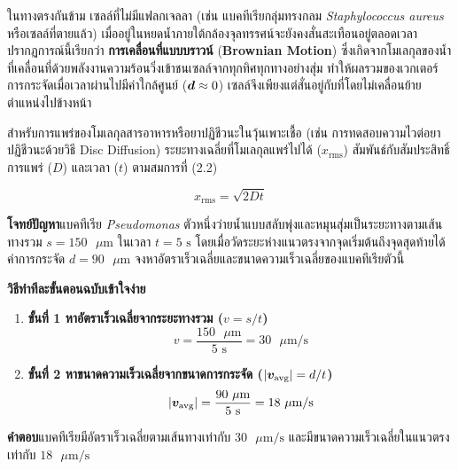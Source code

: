\vspace{4pt}


ในทางตรงกันข้าม เซลล์ที่ไม่มีแฟลกเจลลา (เช่น แบคทีเรียกลุ่มทรงกลม \textit{Staphylococcus aureus} หรือเซลล์ที่ตายแล้ว) เมื่ออยู่ในหยดน้ำภายใต้กล้องจุลทรรศน์จะยังคงสั่นสะเทือนอยู่ตลอดเวลา ปรากฏการณ์นี้เรียกว่า \textbf{การเคลื่อนที่แบบบราวน์} (\textbf{Brownian Motion}) ซึ่งเกิดจากโมเลกุลของน้ำที่เคลื่อนที่ด้วยพลังงานความร้อนวิ่งเข้าชนเซลล์จากทุกทิศทุกทางอย่างสุ่ม ทำให้ผลรวมของเวกเตอร์การกระจัดเมื่อเวลาผ่านไปมีค่าใกล้ศูนย์ ($\bm{d} \approx 0$) เซลล์จึงเพียงแต่สั่นอยู่กับที่โดยไม่เคลื่อนย้ายตำแหน่งไปข้างหน้า

สำหรับการแพร่ของโมเลกุลสารอาหารหรือยาปฏิชีวนะในวุ้นเพาะเชื้อ (เช่น การทดสอบความไวต่อยาปฏิชีวนะด้วยวิธี Disc Diffusion) ระยะทางเฉลี่ยที่โมเลกุลแพร่ไปได้ ($x_{\text{rms}}$) สัมพันธ์กับสัมประสิทธิ์การแพร่ ($D$) และเวลา ($t$) ตามสมการที่ (2.2)

\begin{equation}
    x_{\text{rms}} = \sqrt{2 D t}
\end{equation}

\begin{worked}
\textbf{โจทย์ปัญหา}\quad แบคทีเรีย \textit{Pseudomonas} ตัวหนึ่งว่ายน้ำแบบสลับพุ่งและหมุนสุ่มเป็นระยะทางตามเส้นทางรวม $s = 150\text{ }\mu\text{m}$ ในเวลา $t = 5\text{ s}$ โดยเมื่อวัดระยะห่างแนวตรงจากจุดเริ่มต้นถึงจุดสุดท้ายได้ค่าการกระจัด $d = 90\text{ }\mu\text{m}$ จงหาอัตราเร็วเฉลี่ยและขนาดความเร็วเฉลี่ยของแบคทีเรียตัวนี้

\textbf{วิธีทำทีละขั้นตอนฉบับเข้าใจง่าย}
\begin{enumerate}
    \item \textbf{ขั้นที่ 1 หาอัตราเร็วเฉลี่ยจากระยะทางรวม ($v = s / t$)}
    \[
        v = \frac{150\text{ }\mu\text{m}}{5\text{ s}} = 30\text{ }\mu\text{m/s}
    \]
    \item \textbf{ขั้นที่ 2 หาขนาดความเร็วเฉลี่ยจากขนาดการกระจัด ($|\bm{v}_{\text{avg}}| = d / t$)}
    \[
        |\bm{v}_{\text{avg}}| = \frac{90\text{ }\mu\text{m}}{5\text{ s}} = 18\text{ }\mu\text{m/s}
    \]
\end{enumerate}
\textbf{คำตอบ}\quad แบคทีเรียมีอัตราเร็วเฉลี่ยตามเส้นทางเท่ากับ $30\text{ }\mu\text{m/s}$ และมีขนาดความเร็วเฉลี่ยในแนวตรงเท่ากับ $18\text{ }\mu\text{m/s}$
\end{worked}


